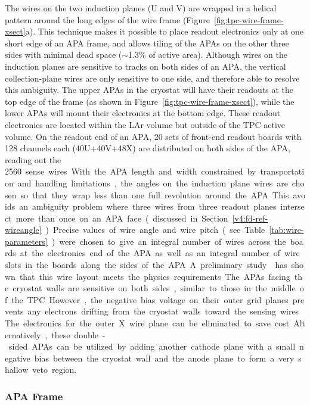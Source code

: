 The wires on the two induction planes (U and V) are wrapped in a
helical pattern around the long edges of the wire frame
(Figure~\ref{fig:tpc-wire-frame-xsect}a). This technique makes it
possible to place readout electronics only at one short edge of an APA
frame, and allows tiling of the APAs on the other three sides with
minimal dead space ($\sim$1.3\% of active area).  Although wires on
the induction planes are sensitive to tracks on both sides of an APA,
the vertical collection-plane wires are only sensitive to one side,
and therefore able to resolve this ambiguity.  The upper APAs in the
cryostat will have their readouts at the top edge of the frame (as
shown in Figure~\ref{fig:tpc-wire-frame-xsect}), while the lower APAs
will mount their electronics at the bottom edge.  These readout
electronics are located within the LAr volume but outside of the TPC
active volume.  On the readout end of an APA, 20 sets of front-end
readout boards with 128 channels each (40U+40V+48X) are distributed on
both sides of the APA, reading out the \SI{2560} sense wires.

With the APA length and width constrained by transportation and handling
limitations, the angles on the induction plane wires are chosen so
that they wrap less than one full revolution around the APA.  This
avoids an ambiguity problem where three wires from three readout
planes intersect more than once on an APA face (discussed in 
Section~\ref{v4:fd-ref-wireangle}).  Precise values of
wire angle and wire pitch (see Table~\ref{tab:wire-parameters}) were
chosen to give an integral number of wires across the boards at the
electronics end of the APA as well as an integral number of wire slots
in the boards along the sides of the APA.  A preliminary
study\cite{wire-orientation} has shown that this wire layout meets the
physics requirements.

The APAs facing the cryostat walls are sensitive on both sides, similar to
 those in the middle of the TPC.  However, the negative bias
voltage on their outer grid planes prevents any electrons drifting
from the cryostat walls toward the sensing wires.  The electronics for
the outer X wire plane can be eliminated to save cost.  Alternatively, 
these double-sided APAs can be utilized by adding another cathode plane
with a small negative bias between the cryostat wall and the anode plane to
form a very shallow veto region.

\subsubsection{APA Frame}
\label{subsec:fd-ref-apaframes}

